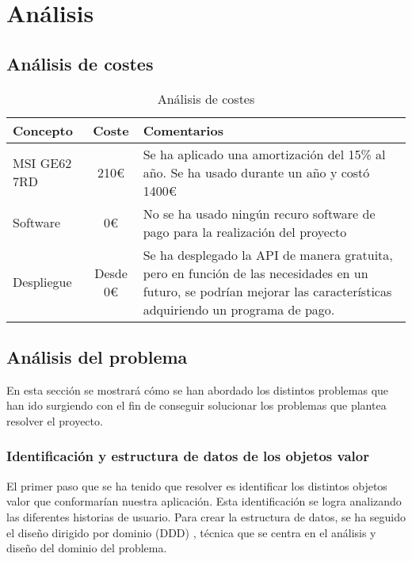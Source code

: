 \chapter{Análisis}

\section{Análisis de costes}

\begin{table}[h]
    \centering
    \begin{tabular}{| l | c | p{6cm} |}
        \hline
        \textbf{Concepto} & \textbf{Coste} & \textbf{Comentarios}\\
        \hline
        MSI GE62 7RD & 210€ & Se ha aplicado una amortización del 15\% al año. Se ha usado durante un año y costó 1400€ \\
        \hline
        Software & 0€ & No se ha usado ningún recuro software de pago para la realización del proyecto\\
        \hline
        Despliegue & Desde 0€ & Se ha desplegado la API de manera gratuita, pero en función de las necesidades en un futuro, se podrían mejorar las características adquiriendo un programa de pago.\\
        \hline
    \end{tabular}
    \caption{Análisis de costes}
\end{table}

\newpage

\section{Análisis del problema}
 
En esta sección se mostrará cómo se han abordado los distintos problemas que han ido surgiendo con el fin de conseguir solucionar los problemas que plantea resolver 
el proyecto.

\subsection{Identificación y estructura de datos de los objetos valor}

El primer paso que se ha tenido que resolver es identificar los distintos objetos valor que conformarían nuestra aplicación. Esta identificación se logra analizando las diferentes historias de usuario.
Para crear la estructura de datos, se ha seguido el diseño dirigido por dominio (DDD) \cite{ddd}, técnica que se centra en el análisis y diseño del dominio del problema.

